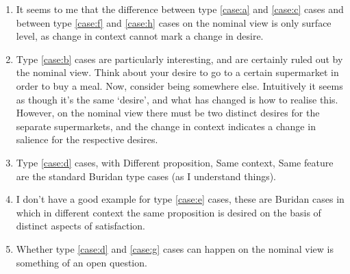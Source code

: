 \documentclass[10pt]{article}
\begin{document}
\begin{enumerate}
\item It seems to me that the difference between type \ref{case:a} and \ref{case:c} cases and between type \ref{case:f} and \ref{case:h} cases on the nominal view is only surface level, as change in context cannot mark a change in desire.
\item Type \ref{case:b} cases are particularly interesting, and are certainly ruled out by the nominal view.
  Think about your desire to go to a certain supermarket in order to buy a meal.
  Now, consider being somewhere else.
  Intuitively it seems as though it's the same `desire', and what has changed is how to realise this.
  However, on the nominal view there must be two distinct desires for the separate supermarkets, and the change in context indicates a change in salience for the respective desires.
\item Type \ref{case:d} cases, with Different proposition, Same context, Same feature are the standard Buridan type cases (as I understand things).
\item I don't have a good example for type \ref{case:e} cases, these are Buridan cases in which in different context the same proposition is desired on the basis of distinct aspects of satisfaction.
\item Whether type \ref{case:d} and \ref{case:g} cases can happen on the nominal view is something of an open question.
\end{enumerate}









\end{document}
